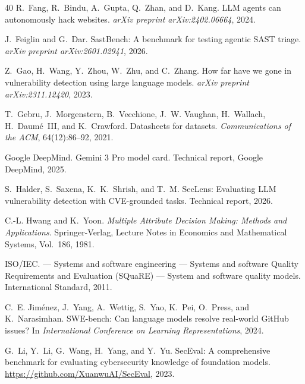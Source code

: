 \documentclass[10pt,twocolumn]{article}
\begin{document}
\begin{thebibliography}{40}
R.~Fang, R.~Bindu, A.~Gupta, Q.~Zhan, and D.~Kang.
\newblock LLM agents can autonomously hack websites.
\newblock \emph{arXiv preprint arXiv:2402.06664}, 2024.

J.~Feiglin and G.~Dar.
\newblock SastBench: A benchmark for testing agentic SAST triage.
\newblock \emph{arXiv preprint arXiv:2601.02941}, 2026.

Z.~Gao, H.~Wang, Y.~Zhou, W.~Zhu, and C.~Zhang.
\newblock How far have we gone in vulnerability detection using large language models.
\newblock \emph{arXiv preprint arXiv:2311.12420}, 2023.

T.~Gebru, J.~Morgenstern, B.~Vecchione, J.~W. Vaughan, H.~Wallach, H.~Daum{\'e}~III, and K.~Crawford.
\newblock Datasheets for datasets.
\newblock \emph{Communications of the ACM}, 64(12):86--92, 2021.

Google DeepMind.
\newblock Gemini 3 Pro model card.
\newblock Technical report, Google DeepMind, 2025.

S.~Halder, S.~Saxena, K.~K.~Shrish, and T.~M.
\newblock SecLens: Evaluating LLM vulnerability detection with CVE-grounded tasks.
\newblock Technical report, 2026.

C.-L. Hwang and K.~Yoon.
\newblock \emph{Multiple Attribute Decision Making: Methods and Applications}.
\newblock Springer-Verlag, Lecture Notes in Economics and Mathematical Systems, Vol.~186, 1981.

{ISO/IEC}.
 --- Systems and software engineering --- Systems and software Quality Requirements and Evaluation (SQuaRE) --- System and software quality models.
\newblock International Standard, 2011.

C.~E. Jim{\'e}nez, J.~Yang, A.~Wettig, S.~Yao, K.~Pei, O.~Press, and K.~Narasimhan.
\newblock SWE-bench: Can language models resolve real-world GitHub issues?
\newblock In \emph{International Conference on Learning Representations}, 2024.

G.~Li, Y.~Li, G.~Wang, H.~Yang, and Y.~Yu.
\newblock SecEval: A comprehensive benchmark for evaluating cybersecurity knowledge of foundation models.
\newblock \url{https://github.com/XuanwuAI/SecEval}, 2023.


\end{thebibliography}
\end{document}
